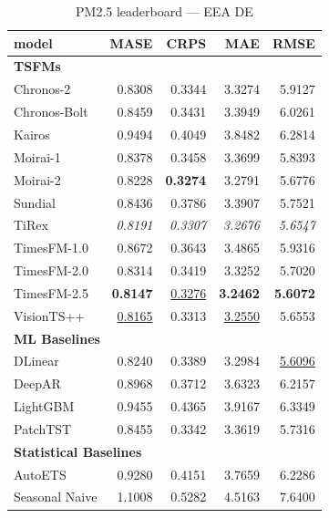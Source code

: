\begin{table}[H]
\caption{PM2.5 leaderboard --- EEA DE}
\centering
\begin{small}
\begin{tabular}{lrrrr}
\toprule
model & MASE & CRPS & MAE & RMSE \\
\midrule
\multicolumn{5}{l}{\textbf{TSFMs}} \\
Chronos-2 & 0.8308 & 0.3344 & 3.3274 & 5.9127 \\
Chronos-Bolt & 0.8459 & 0.3431 & 3.3949 & 6.0261 \\
Kairos & 0.9494 & 0.4049 & 3.8482 & 6.2814 \\
Moirai-1 & 0.8378 & 0.3458 & 3.3699 & 5.8393 \\
Moirai-2 & 0.8228 & \textbf{0.3274} & 3.2791 & 5.6776 \\
Sundial & 0.8436 & 0.3786 & 3.3907 & 5.7521 \\
TiRex & \textit{0.8191} & \textit{0.3307} & \textit{3.2676} & \textit{5.6547} \\
TimesFM-1.0 & 0.8672 & 0.3643 & 3.4865 & 5.9316 \\
TimesFM-2.0 & 0.8314 & 0.3419 & 3.3252 & 5.7020 \\
TimesFM-2.5 & \textbf{0.8147} & \underline{0.3276} & \textbf{3.2462} & \textbf{5.6072} \\
VisionTS++ & \underline{0.8165} & 0.3313 & \underline{3.2550} & 5.6553 \\
\midrule
\multicolumn{5}{l}{\textbf{ML Baselines}} \\
DLinear & 0.8240 & 0.3389 & 3.2984 & \underline{5.6096} \\
DeepAR & 0.8968 & 0.3712 & 3.6323 & 6.2157 \\
LightGBM & 0.9455 & 0.4365 & 3.9167 & 6.3349 \\
PatchTST & 0.8455 & 0.3342 & 3.3619 & 5.7316 \\
\midrule
\multicolumn{5}{l}{\textbf{Statistical Baselines}} \\
AutoETS & 0.9280 & 0.4151 & 3.7659 & 6.2286 \\
Seasonal Naive & 1.1008 & 0.5282 & 4.5163 & 7.6400 \\
\bottomrule
\end{tabular}
\end{small}
\end{table}